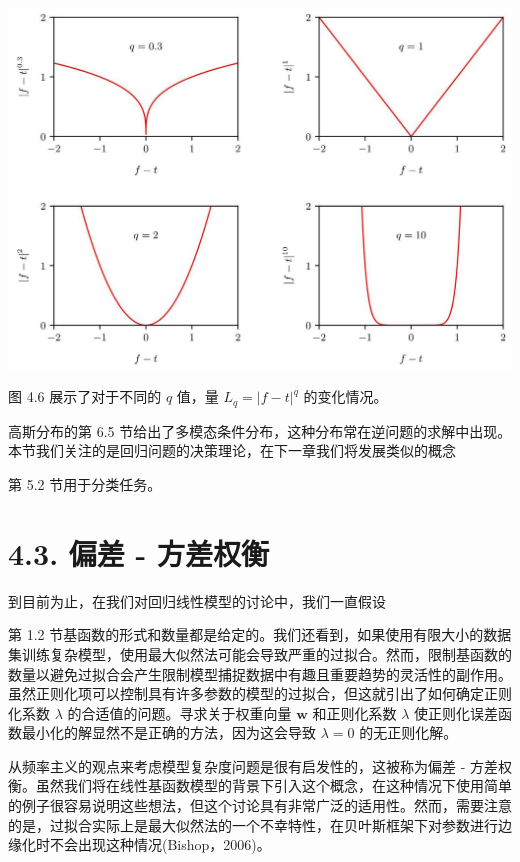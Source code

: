 \documentclass[10pt]{report}
\begin{document}
\begin{center}
\includegraphics[max width=1.0\textwidth]{images/0194e279-9b28-703a-88f4-c3ac21e2010d_142_232_345_1321_946_0.jpg}
\end{center}
\hspace*{3em} 

图 4.6 展示了对于不同的 \(q\) 值，量 \({L}_{q} = {\left| f - t\right| }^{q}\) 的变化情况。

高斯分布的第 6.5 节给出了多模态条件分布，这种分布常在逆问题的求解中出现。本节我们关注的是回归问题的决策理论，在下一章我们将发展类似的概念

第 5.2 节用于分类任务。

\section*{4.3. 偏差 - 方差权衡}

到目前为止，在我们对回归线性模型的讨论中，我们一直假设

第 1.2 节基函数的形式和数量都是给定的。我们还看到，如果使用有限大小的数据集训练复杂模型，使用最大似然法可能会导致严重的过拟合。然而，限制基函数的数量以避免过拟合会产生限制模型捕捉数据中有趣且重要趋势的灵活性的副作用。虽然正则化项可以控制具有许多参数的模型的过拟合，但这就引出了如何确定正则化系数 \(\lambda\) 的合适值的问题。寻求关于权重向量 \(\mathbf{w}\) 和正则化系数 \(\lambda\) 使正则化误差函数最小化的解显然不是正确的方法，因为这会导致 \(\lambda  = 0\) 的无正则化解。

从频率主义的观点来考虑模型复杂度问题是很有启发性的，这被称为偏差 - 方差权衡。虽然我们将在线性基函数模型的背景下引入这个概念，在这种情况下使用简单的例子很容易说明这些想法，但这个讨论具有非常广泛的适用性。然而，需要注意的是，过拟合实际上是最大似然法的一个不幸特性，在贝叶斯框架下对参数进行边缘化时不会出现这种情况(Bishop，2006)。
\end{document}
